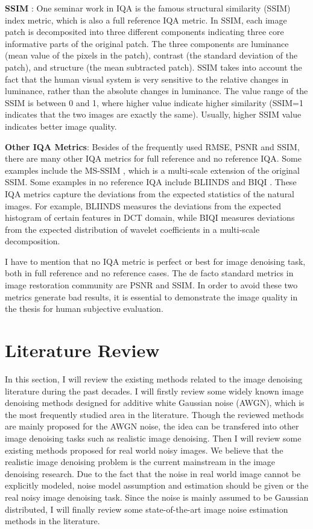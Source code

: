 \textbf{SSIM} \cite{ssim}: One seminar work in IQA is the famous structural similarity (SSIM) index metric, which is also a full reference IQA metric. In SSIM, each image patch is decomposited into three different components indicating three core informative parts of the original patch. The three components are luminance (mean value of the pixels in the patch), contrast (the standard deviation of the patch), and structure (the mean subtracted patch). SSIM takes into account the fact that the human visual system is very sensitive to the relative changes in luminance, rather than the absolute changes in luminance. The value range of the SSIM is between 0 and 1, where higher value indicate higher similarity (SSIM=1 indicates that the two images are exactly the same). Usually, higher SSIM value indicates better image quality. 

\textbf{Other IQA Metrics}: Besides of the frequently used RMSE, PSNR and SSIM, there are many other IQA metrics for full reference and no reference IQA. Some examples include the MS-SSIM \cite{msssim}, which is a multi-scale extension of the original SSIM. Some examples in no reference IQA include BLIINDS \cite{bliinds} and BIQI \cite{biqi}. These IQA metrics capture the deviations from the expected statistics of the natural images. For example, BLIINDS measures the deviations from the expected histogram of certain features in DCT domain, while BIQI measures deviations from the expected distribution of wavelet coefficients in a multi-scale decomposition.

I have to mention that no IQA metric is perfect or best for image denoising task, both in full reference and no reference cases. The de facto standard metrics in image restoration community are PSNR and SSIM. In order to avoid these two metrics generate bad results, it is essential to demonstrate the image quality in the thesis for human subjective evaluation.


\section{Literature Review}

In this section, I will review the existing methods related to the image denoising literature during the past decades. I will firstly review some widely known image denoising methods designed for additive white Gaussian noise (AWGN), which is the most frequently studied area in the literature. Though the reviewed methods are mainly proposed for the AWGN noise, the idea can be transfered into other image denoising tasks such as realistic image denoising. Then I will review some existing methods proposed for real world noisy images. We believe that the realistic image denoising problem is the current mainstream in the image denoising research. Due to the fact that the noise in real world image cannot be explicitly modeled, noise model assumption and estimation should be given or the real noisy image denoising task. Since the noise is mainly assumed to be Gaussian distributed, I will finally review some state-of-the-art image noise estimation methods in the literature.

